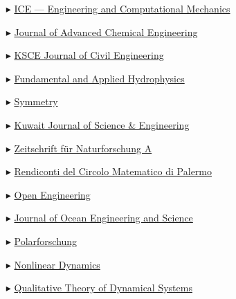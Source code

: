 \begin{itemize}
    \item[$\blacktriangleright$] \href{http://www.icevirtuallibrary.com/content/serial/eacm/}{ICE --- Engineering and Computational Mechanics}
    
    \item[$\blacktriangleright$] \href{http://www.ashdin.com/journals/jace/jace.aspx}{Journal of Advanced Chemical Engineering}
    
    \item[$\blacktriangleright$] \href{http://www.springer.com/engineering/civil+engineering/journal/12205}{KSCE Journal of Civil Engineering}
    
    \item[$\blacktriangleright$] \href{http://hydrophysics.info/?lang=en}{Fundamental and Applied Hydrophysics}
    
    \item[$\blacktriangleright$] \href{http://www.mdpi.com/journal/symmetry}{Symmetry}
    
    \item[$\blacktriangleright$] \href{http://pubcouncil.kuniv.edu.kw/kjs/}{Kuwait Journal of Science \& Engineering}
    
    \item[$\blacktriangleright$] \href{http://www.degruyter.com/view/j/zna}{Zeitschrift f\"ur Naturforschung A}
    
    \item[$\blacktriangleright$] \href{http://www.springer.com/mathematics/journal/12215}{Rendiconti del Circolo Matematico di Palermo }
    
    \item[$\blacktriangleright$] \href{https://www.degruyter.com/view/j/eng}{Open Engineering}

    \item[$\blacktriangleright$] \href{https://www.sciencedirect.com/journal/journal-of-ocean-engineering-and-science/}{Journal of Ocean Engineering and Science}
    
    \item[$\blacktriangleright$] \href{http://www.polarforschung.de/}{Polarforschung}
    
    \item[$\blacktriangleright$] \href{https://link.springer.com/journal/11071}{Nonlinear Dynamics}

    \item[$\blacktriangleright$] \href{https://link.springer.com/journal/12346}{Qualitative Theory of Dynamical Systems}


\end{itemize}
